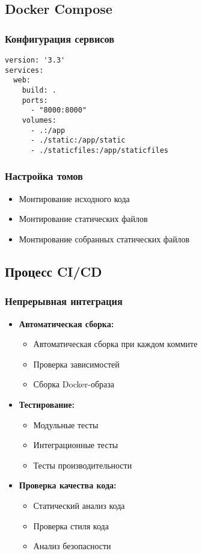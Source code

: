 \documentclass[12pt,a4paper]{article}
\begin{document}
\subsection{Docker Compose}
\subsubsection{Конфигурация сервисов}
\begin{verbatim}
version: '3.3'
services:
  web:
    build: .
    ports:
      - "8000:8000"
    volumes:
      - .:/app
      - ./static:/app/static
      - ./staticfiles:/app/staticfiles
\end{verbatim}

\subsubsection{Настройка томов}
\begin{itemize}
    \item Монтирование исходного кода
    \item Монтирование статических файлов
    \item Монтирование собранных статических файлов
\end{itemize}

\subsection{Процесс CI/CD}
\subsubsection{Непрерывная интеграция}
\begin{itemize}
    \item \textbf{Автоматическая сборка:}
    \begin{itemize}
        \item Автоматическая сборка при каждом коммите
        \item Проверка зависимостей
        \item Сборка Docker-образа
    \end{itemize}
    \item \textbf{Тестирование:}
    \begin{itemize}
        \item Модульные тесты
        \item Интеграционные тесты
        \item Тесты производительности
    \end{itemize}
    \item \textbf{Проверка качества кода:}
    \begin{itemize}
        \item Статический анализ кода
        \item Проверка стиля кода
        \item Анализ безопасности
    \end{itemize}
\end{itemize}
\end{document}
